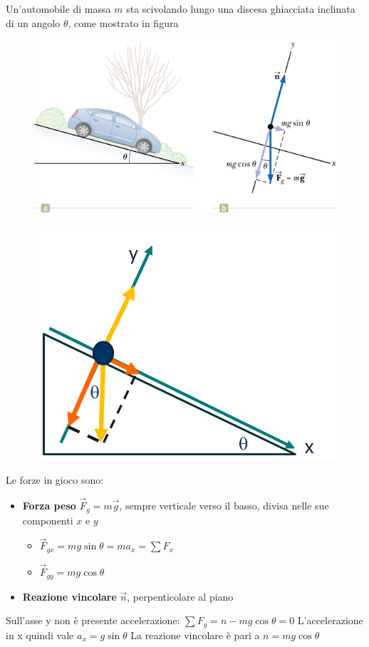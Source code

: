 \documentclass[12pt,oneside]{book}
\begin{document}
\noindent Un’automobile di massa $m$ sta scivolando lungo una discesa ghiacciata inclinata di un angolo $\theta$, come mostrato in figura
\begin{figure}[h]
    \centering
    \includegraphics[scale=0.45]{piano_inclinato} ~~
    \includegraphics[scale=0.2]{piano_inclinato_forze}
\end{figure}

\noindent Le forze in gioco sono:
\begin{itemize}
    \item \textbf{Forza peso} $\vec{F}_g = m\vec{g}$, sempre verticale verso il basso, divisa nelle sue componenti $x$ e $y$
    \begin{itemize}
        \item $\vec{F}_{gx} = mg \sin{\theta} = ma_x = \sum F_x$
        \item $\vec{F}_{gy} = mg \cos{\theta}$
    \end{itemize}
    \item \textbf{Reazione vincolare} $\vec{n}$, perpenticolare al piano
\end{itemize}
Sull'asse y non è presente accelerazione: $\sum F_y = n - mg \cos{\theta} = 0$ \newline
L'accelerazione in x quindi vale $a_x = g \sin{\theta}$ \newline
La reazione vincolare è pari a $n = mg \cos{\theta}$
\end{document}
